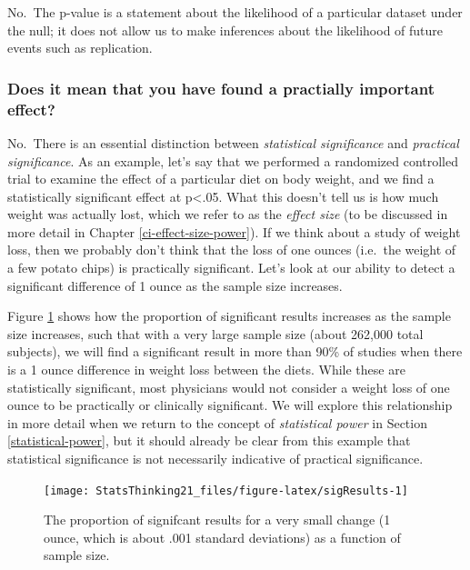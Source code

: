 \documentclass[12pt,]{book}
\theoremstyle{definition}
\theoremstyle{definition}
\theoremstyle{definition}
\theoremstyle{remark}
\begin{document}
No.~The p-value is a statement about the likelihood of a particular dataset under the null; it does not allow us to make inferences about the likelihood of future events such as replication.

\hypertarget{does-it-mean-that-you-have-found-a-practially-important-effect}{%
\subsubsection{Does it mean that you have found a practially important effect?}\label{does-it-mean-that-you-have-found-a-practially-important-effect}}

No.~There is an essential distinction between \emph{statistical significance} and \emph{practical significance}. As an example, let's say that we performed a randomized controlled trial to examine the effect of a particular diet on body weight, and we find a statistically significant effect at p\textless{}.05. What this doesn't tell us is how much weight was actually lost, which we refer to as the \emph{effect size} (to be discussed in more detail in Chapter \ref{ci-effect-size-power}). If we think about a study of weight loss, then we probably don't think that the loss of one ounces (i.e.~the weight of a few potato chips) is practically significant. Let's look at our ability to detect a significant difference of 1 ounce as the sample size increases.

Figure \ref{fig:sigResults} shows how the proportion of significant results increases as the sample size increases, such that with a very large sample size (about 262,000 total subjects), we will find a significant result in more than 90\% of studies when there is a 1 ounce difference in weight loss between the diets. While these are statistically significant, most physicians would not consider a weight loss of one ounce to be practically or clinically significant. We will explore this relationship in more detail when we return to the concept of \emph{statistical power} in Section \ref{statistical-power}, but it should already be clear from this example that statistical significance is not necessarily indicative of practical significance.

\begin{figure}
\texttt{[image: StatsThinking21\_files/figure-latex/sigResults-1]} \caption{The proportion of signifcant results for a very small change (1 ounce, which is about .001 standard deviations) as a function of sample size.}\label{fig:sigResults}
\end{figure}
\end{document}
